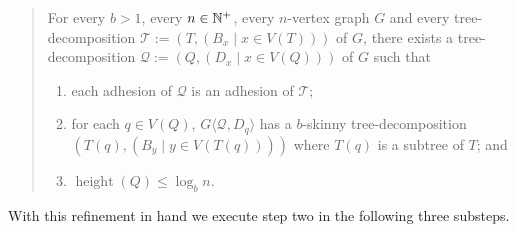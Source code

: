 \documentclass{patmorin}
\renewcommand{\le}{\leqslant}
\newcommand{\torso}[2]{{#1}\langle{#2}\rangle}
\DeclareMathOperator{\height}{height}
\newcommand{\calQ}{\mathcal{Q}}
\newcommand{\calT}{\mathcal{T}}
\begin{document}
  \begin{quote}    
    For every $b>1$, every $n\in\mathbb{N}^+$, every $n$-vertex graph $G$ and every tree-decomposition $\calT:=(T,(B_x\mid x\in V(T)))$ of $G$, there exists a tree-decomposition $\calQ:=(Q,(D_x\mid x\in V(Q)))$ of $G$ such that
    \begin{enumerate}[nosep,nolistsep,label=\rm(\roman*)]
      \item\label{prop_adhesion}
      each adhesion of $\calQ$ is an adhesion of $\calT$;
      \item\label{prop_skinny_torso} for each $q\in V(Q)$, $\torso{G}{\calQ,D_q}$ has a $b$-skinny tree-decomposition $(T(q), (B_y\mid y\in V(T(q))))$ where $T(q)$ is a subtree of $T$; and
      \item\label{prop_geometric} $\height(Q)\le \log_b n$.
    \end{enumerate}
  \end{quote}

With this refinement in hand we execute step two in the following three substeps.
\end{document}
